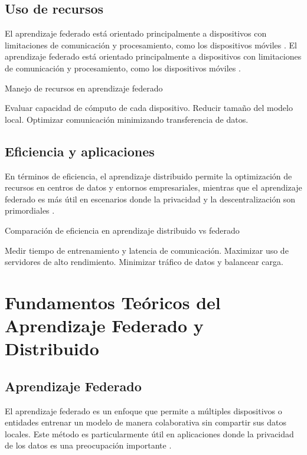 \subsection{Uso de recursos}
El aprendizaje federado está orientado principalmente a dispositivos con limitaciones de comunicación y procesamiento, como los dispositivos móviles \cite{yang2019federated}.
El aprendizaje federado está orientado principalmente a dispositivos con limitaciones de comunicación y procesamiento, como los dispositivos móviles \cite{yang2019federated}.

\begin{algorithm}
	\caption{Manejo de recursos en aprendizaje federado}
	\begin{algorithmic}[1]
		\STATE Evaluar capacidad de cómputo de cada dispositivo.
		\STATE Reducir tamaño del modelo local.
		\STATE Optimizar comunicación minimizando transferencia de datos.
		\ENDIF
	\end{algorithmic}
\end{algorithm}
\subsection{Eficiencia y aplicaciones}
En términos de eficiencia, el aprendizaje distribuido permite la optimización de recursos en centros de datos y entornos empresariales, mientras que el aprendizaje federado es más útil en escenarios donde la privacidad y la descentralización son primordiales \cite{kairouz2021advances}.
\begin{algorithm}
	\caption{Comparación de eficiencia en aprendizaje distribuido vs federado}
	\begin{algorithmic}[1]
		\STATE Medir tiempo de entrenamiento y latencia de comunicación.
		\STATE Maximizar uso de servidores de alto rendimiento.
		\STATE Minimizar tráfico de datos y balancear carga.
		\ENDIF
	\end{algorithmic}
\end{algorithm}
\section{Fundamentos Teóricos del Aprendizaje Federado y Distribuido}
\label{chap:2}

\subsection{Aprendizaje Federado}
El aprendizaje federado es un enfoque que permite a múltiples dispositivos o entidades entrenar un modelo de manera colaborativa sin compartir sus datos locales. Este método es particularmente útil en aplicaciones donde la privacidad de los datos es una preocupación importante \cite{mcmahan2017communication}.

